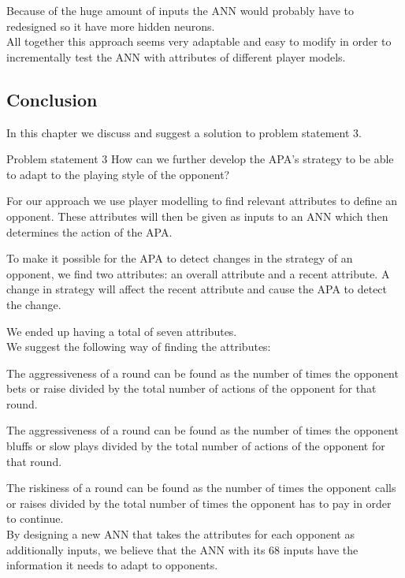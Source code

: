 Because of the huge amount of inputs the ANN would probably have to redesigned so it have more hidden neurons.\\

All together this approach seems very adaptable and easy to modify in order to incrementally test the ANN with attributes of different player models.


\subsection{Conclusion}
In this chapter we discuss and suggest a solution to problem statement 3.

\vspace{4mm}
\begin{statementBox2}{Problem statement 3}
How can we further develop the APA's strategy to be able to adapt to the playing style of the opponent?
\end{statementBox2}
\vspace{4mm} 

For our approach we use player modelling to find relevant attributes to define an opponent. These attributes will then be given as inputs to an ANN which then determines the action of the APA. 

To make it possible for the APA to detect changes in the strategy of an opponent, we find two attributes: an overall attribute and a recent attribute. A change in strategy will affect the recent attribute and cause the APA to detect the change.

We ended up having a total of seven attributes.\\

We suggest the following way of finding the attributes:

The aggressiveness of a round can be found as the number of times the opponent bets or raise divided by the total number of actions of the opponent for that round.

The aggressiveness of a round can be found as the number of times the opponent bluffs or slow plays divided by the total number of actions of the opponent for that round.

The riskiness of a round can be found as the number of times the opponent calls or raises divided by the total number of times the opponent has to pay in order to continue.\\

By designing a new ANN that takes the attributes for each opponent as additionally inputs, we believe that the ANN with its 68 inputs have the information it needs to adapt to opponents.
